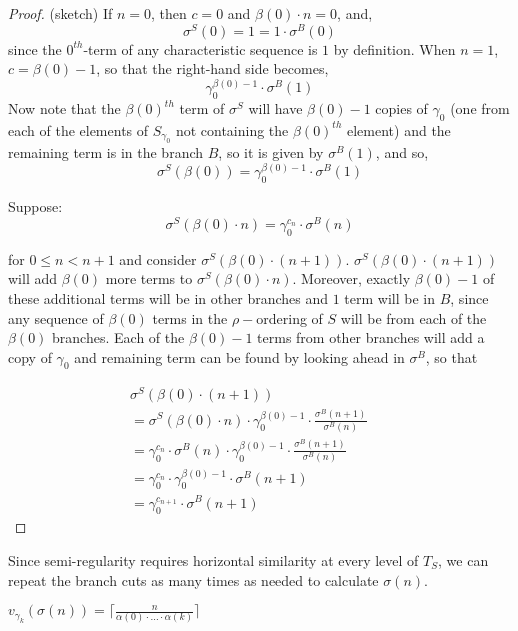 \begin{proof}
(sketch)
If $n=0$, then $c=0$ and $\beta(0) \cdot n = 0$, and,
\[\sigma^S(0)= 1 =	1 \cdot \sigma^{B}(0)\]
since the $0^{th}$-term of any characteristic sequence is $1$ by definition. When $n=1$, $c=\beta(0)-1$, so that the right-hand side becomes,
\[\gamma_0^{\beta(0)-1} \cdot \sigma^{B}(1)\]
Now note that the $\beta(0)^{th}$ term of $\sigma^S$ will have $\beta(0)-1$ copies of $\gamma_0$ (one from each of the elements of $S_{\gamma_0}$ not containing the $\beta(0)^{th}$ element) and the remaining term is in the branch $B$, so it is given by $\sigma^B(1)$, and so,
\[\sigma^S(\beta(0))=\gamma_0^{\beta(0)-1} \cdot \sigma^{B}(1)\]


Suppose:
\[\sigma^S(\beta(0) \cdot n)=\gamma_0^{c_n} \cdot \sigma^{B}(n)\]

for $0 \leq n < n +1$ and consider $\sigma^S(\beta(0) \cdot (n+1))$. $\sigma^S(\beta(0) \cdot (n+1))$ will add $\beta(0)$ more terms to $\sigma^S(\beta(0) \cdot n)$. Moreover, exactly $\beta(0)-1$ of these additional terms will be in other branches and $1$ term will be in $B$, since any sequence of $\beta(0)$ terms in the $\rho-$ordering of $S$ will be from each of the $\beta(0)$ branches. Each of the $\beta(0)-1$ terms from other branches will add a copy of $\gamma_0$ and remaining term can be found by looking ahead in $\sigma^B$, so that

\begin{align*}
\sigma^S(\beta(0) \cdot (n+1)) && \\
= \sigma^S(\beta(0) \cdot n) \cdot \gamma_0^{\beta(0)-1} \cdot \frac{\sigma^B(n+1)}{\sigma^B(n)} && \\
= {\gamma_0^{c_n}} \cdot \sigma^{B}(n) \cdot \gamma_0^{\beta(0)-1} \cdot  \frac{\sigma^B(n+1)}{\sigma^B(n)} &&\\
= {\gamma_0^{c_n}}  \cdot \gamma_0^{\beta(0)-1} \cdot  \sigma^B(n+1) && \\
= {\gamma_0^{c_{n+1}}} \cdot  \sigma^B(n+1) 
\end{align*}

\end{proof}

Since semi-regularity requires horizontal similarity at every level of $T_S$, we can repeat the branch cuts as many times as needed to calculate $\sigma(n)$.
\begin{corollary*}
$v_{\gamma_k}(\sigma(n)) = \lceil\frac{n}{\alpha(0)\cdot \ldots \cdot \alpha(k)}\rceil$
\end{corollary*}


